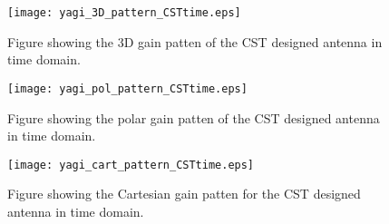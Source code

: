 \begin{figure}[!h]
  \centering
  \texttt{[image: yagi\_3D\_pattern\_CSTtime.eps]}
  \caption{Figure showing the 3D gain patten of the CST designed antenna in time domain.}
  \label{fig:yagi_3D_pattern_CSTtime}
\end{figure}

\begin{figure}[!h]
  \centering
  \texttt{[image: yagi\_pol\_pattern\_CSTtime.eps]}
  \caption{Figure showing the polar gain patten of the CST designed antenna in time domain.}
  \label{fig:yagi_pol_pattern_CSTtime}
\end{figure}

\begin{figure}[!h]
  \centering
  \texttt{[image: yagi\_cart\_pattern\_CSTtime.eps]}
  \caption{Figure showing the Cartesian gain patten for the CST designed antenna in time domain.}
  \label{fig:yagi_cart_pattern_CSTtime}
\end{figure}
